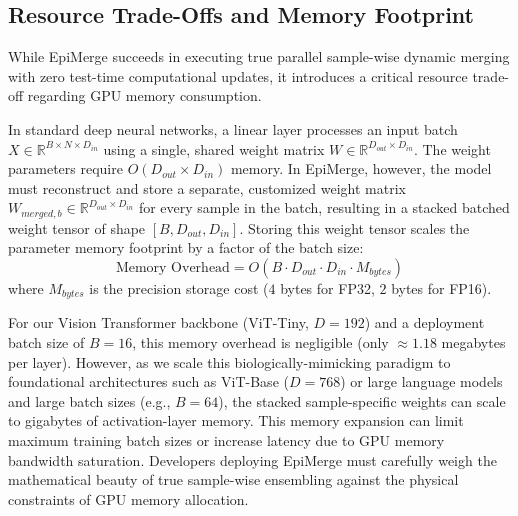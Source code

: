 \subsection{Resource Trade-Offs and Memory Footprint}
While EpiMerge succeeds in executing true parallel sample-wise dynamic merging with zero test-time computational updates, it introduces a critical resource trade-off regarding GPU memory consumption.

In standard deep neural networks, a linear layer processes an input batch $X \in \mathbb{R}^{B \times N \times D_{in}}$ using a single, shared weight matrix $W \in \mathbb{R}^{D_{out} \times D_{in}}$. The weight parameters require $O(D_{out} \times D_{in})$ memory. In EpiMerge, however, the model must reconstruct and store a separate, customized weight matrix $W_{merged, b} \in \mathbb{R}^{D_{out} \times D_{in}}$ for every sample in the batch, resulting in a stacked batched weight tensor of shape $[B, D_{out}, D_{in}]$. Storing this weight tensor scales the parameter memory footprint by a factor of the batch size:
\begin{equation}
    \text{Memory Overhead} = O(B \cdot D_{out} \cdot D_{in} \cdot M_{bytes})
\end{equation}
where $M_{bytes}$ is the precision storage cost ($4$ bytes for FP32, $2$ bytes for FP16).

For our Vision Transformer backbone (ViT-Tiny, $D=192$) and a deployment batch size of $B=16$, this memory overhead is negligible (only $\approx 1.18$ megabytes per layer). However, as we scale this biologically-mimicking paradigm to foundational architectures such as ViT-Base ($D = 768$) or large language models and large batch sizes (e.g., $B=64$), the stacked sample-specific weights can scale to gigabytes of activation-layer memory. This memory expansion can limit maximum training batch sizes or increase latency due to GPU memory bandwidth saturation. Developers deploying EpiMerge must carefully weigh the mathematical beauty of true sample-wise ensembling against the physical constraints of GPU memory allocation.

